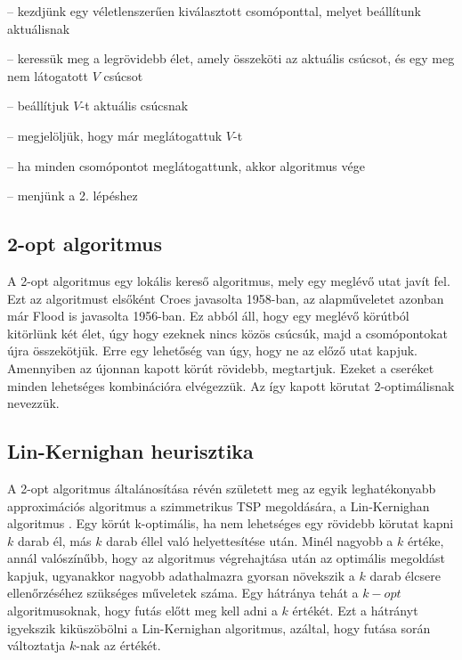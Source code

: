 \begin{description}
	\setlength{\itemsep}{0.04mm}
	\item[1. lépés] -- kezdjünk egy véletlenszerűen kiválasztott csomóponttal, melyet beállítunk aktuálisnak
	\item[2. lépés] -- keressük meg a legrövidebb élet, amely összeköti az aktuális csúcsot, és egy meg nem látogatott \(V\) csúcsot
	\item[3. lépés] -- beállítjuk \(V\)-t aktuális csúcsnak
	\item[4. lépés] -- megjelöljük, hogy már meglátogattuk \(V\)-t
	\item[5. lépés] -- ha minden csomópontot meglátogattunk, akkor algoritmus vége
	\item[6. lépés] -- menjünk a 2. lépéshez
\end{description}

\subsection{2-opt algoritmus}

A 2-opt algoritmus \cite{comp_tsp} egy lokális kereső algoritmus, mely egy meglévő utat javít fel. Ezt az algoritmust elsőként Croes javasolta 1958-ban, az alapműveletet azonban már Flood is javasolta 1956-ban. Ez abból áll, hogy egy meglévő körútból kitörlünk két élet, úgy hogy ezeknek nincs közös csúcsúk, majd a csomópontokat újra összekötjük. Erre egy lehetőség van úgy, hogy ne az előző utat kapjuk. Amennyiben az újonnan kapott körút rövidebb, megtartjuk. Ezeket a cseréket minden lehetséges kombinációra elvégezzük. Az így kapott körutat 2-optimálisnak nevezzük.

\subsection{Lin-Kernighan heurisztika}

A 2-opt algoritmus általánosítása révén született meg az egyik leghatékonyabb approximációs algoritmus a szimmetrikus TSP megoldására, a Lin-Kernighan algoritmus \cite{lin_kern}. Egy körút k-optimális, ha nem lehetséges egy rövidebb körutat kapni \(k\) darab él, más \(k\) darab éllel való helyettesítése után. Minél nagyobb a \(k\) értéke, annál valószínűbb, hogy az algoritmus végrehajtása után az optimális megoldást kapjuk, ugyanakkor nagyobb adathalmazra gyorsan növekszik a \(k\) darab élcsere ellenőrzéséhez szükséges műveletek száma. Egy hátránya tehát a \(k-opt\) algoritmusoknak, hogy futás előtt meg kell adni a \(k\) értékét. Ezt a hátrányt igyekszik kiküszöbölni a Lin-Kernighan algoritmus, azáltal, hogy futása során változtatja \(k\)-nak az értékét.

